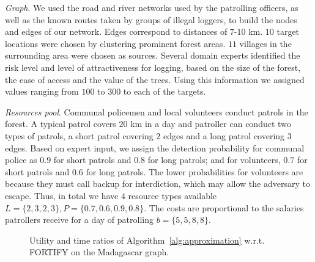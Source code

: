 \textit{Graph}. We used the road and river networks used by the patrolling officers, as well as the known routes taken by groups of illegal loggers, to build the nodes and edges of our network. Edges correspond to distances of $7$-$10$ km. $10$ target locations were chosen by clustering prominent forest areas. $11$ villages in the surrounding area were chosen as sources. Several domain experts identified the risk level and level of attractiveness for logging, based on the size of the forest, the ease of access and the value of the trees. Using this information we assigned values ranging from $100$ to $300$ to each of the targets.

\textit{Resources pool}. Communal policemen and local volunteers conduct patrols in the forest. A typical patrol covers $20$ km in a day and patroller can conduct two types of patrols, a short patrol covering $2$ edges and a long patrol covering $3$ edges. Based on expert input, we assign the detection probability for communal police as $0.9$ for short patrols and $0.8$ for long patrols; and for volunteers, $0.7$ for short patrols and $0.6$ for long patrols. The lower probabilities for volunteers are because they must call backup for interdiction, which may allow the adversary to escape. Thus, in total we have $4$ resource types available $L = \{2,3,2,3\}, P = \{0.7,0.6,0.9,0.8\}$. The costs are proportional to the salaries patrollers receive for a day of patrolling $b = \{5,5,8,8\}$.

\begin{figure}[!htbp]
\centering
{}
\caption{Utility and time ratios of Algorithm~\ref{alg:approximation} w.r.t. FORTIFY on the Madagascar graph.}\label{fig:previous_madagascar}
\end{figure}

